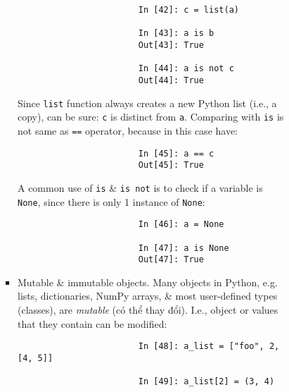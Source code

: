 \documentclass{article}
\begin{document}
\begin{enumerate}
\begin{itemize}
\begin{itemize}
\begin{itemize}
\begin{itemize}
\begin{verbatim}
						In [42]: c = list(a)
						
						In [43]: a is b
						Out[43]: True
						
						In [44]: a is not c
						Out[44]: True
					\end{verbatim}
					Since {\tt list} function always creates a new Python list (i.e., a copy), can be sure: {\tt c} is distinct from {\tt a}. Comparing with {\tt is} is not same as {\tt==} operator, because in this case have:
					\begin{verbatim}
						In [45]: a == c
						Out[45]: True
					\end{verbatim}
					A common use of {\tt is} \& {\tt is not} is to check if a variable is {\tt None}, since there is only 1 instance of {\tt None}:
					\begin{verbatim}
						In [46]: a = None
						
						In [47]: a is None
						Out[47]: True
					\end{verbatim}
					\item {\sf Mutable \& immutable objects.} Many objects in Python, e.g. lists, dictionaries, NumPy arrays, \& most user-defined types (classes), are {\it mutable} (có thể thay đổi). I.e., object or values that they contain can be modified:
					\begin{verbatim}
						In [48]: a_list = ["foo", 2, [4, 5]]
						
						In [49]: a_list[2] = (3, 4)
						

\end{verbatim}
\end{itemize}
\end{itemize}
\end{itemize}
\end{itemize}
\end{enumerate}
\end{document}
